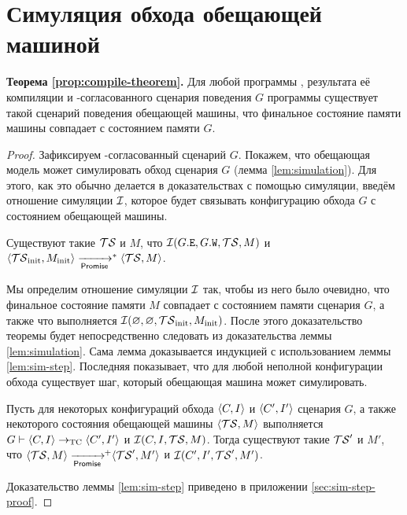 \section{Симуляция обхода обещающей машиной}
\label{sec:simulation} 
\noindent
{\bf Теорема \ref {prop:compile-theorem}.}
  Для любой программы \Prog, результата её компиляции \ProgARM и \ARM-согласованного
  сценария поведения $G$ программы
  \ProgARM существует такой сценарий поведения обещающей машины, что 
  финальное состояние памяти машины совпадает с состоянием памяти $G$.
\begin{proof}
  Зафиксируем \ARM-согласованный сценарий $G$.
Покажем, что обещающая модель может симулировать
  обход сценария $G$ (лемма \ref{lem:simulation}).
 Для этого, как это обычно делается в доказательствах с помощью симуляции, введём
  отношение симуляции $\mathcal{I}$, которое будет связывать конфигурацию обхода $G$ с состоянием обещающей машины.
  
\begin{lemma}
  \label{lem:simulation}
  Существуют такие $\mathcal{TS}$ и $M$, что $\mathcal{I}(G.{\mathtt{E}}, G.{\mathtt{W}}, \mathcal{TS}, M)$ и
  $\tup{\TSf_{\rm init}, M_{\rm init}} \stepp^{*} \tup{\TSf, M}$.
\end{lemma}
  Мы определим отношение симуляции $\mathcal{I}$ так, чтобы из него было очевидно, что финальное состояние памяти
  $M$ совпадает с состоянием памяти сценария $G$, а также что выполняется $\mathcal{I}(\varnothing, \varnothing, \mathcal{TS}_{\rm init}, M_{\rm init})$.
   После этого доказательство теоремы будет непосредственно следовать из доказательства леммы \ref{lem:simulation}.
Сама лемма доказывается индукцией с использованием леммы \ref{lem:sim-step}. Последняя показывает,
  что для любой неполной конфигурации обхода существует шаг, который обещающая машина может симулировать. 
\begin{lemma}
  \label{lem:sim-step}
  Пусть для некоторых конфигураций обхода ${\langle{C, I}\rangle}$ и ${\langle{C', I'}\rangle}$ сценария $G$,
  а также некоторого состояния обещающей машины ${\langle{\ensuremath{\mathcal{TS}}, M}\rangle}$ выполняется
  $G \vdash {\langle{C, I}\rangle} \rightarrow_{\rm TC} {\langle{C', I'}\rangle}$ и
  $\mathcal{I}(C, I, \mathcal{TS}, M)$.
  Тогда существуют такие $\mathcal{TS}'$ и $M'$, что $\tup{\TSf, M} \stepp\!\!^{+} \tup{\TSf', M'}$ и
  $\mathcal{I}(C', I', \mathcal{TS}', M')$.
\end{lemma}
\noindent Доказательство леммы \ref{lem:sim-step} приведено в приложении \ref{sec:sim-step-proof}.
\end{proof}
  
